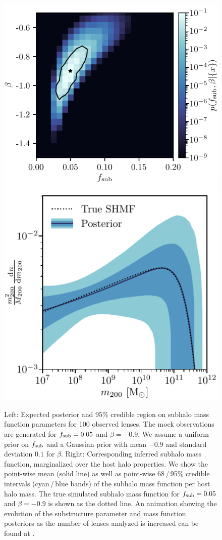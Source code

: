 \documentclass[twocolumn]{aastex63}
\begin{document}
\begin{figure}
\centering
\includegraphics[height=0.4\textwidth]{figures/posterior}%
\hspace*{0.075\textwidth}%
\includegraphics[height=0.4\textwidth]{figures/shmf}%
\hspace*{0.052\textwidth}%
\caption{Left: Expected posterior and $95\%$ credible region on subhalo mass function parameters for 100 observed lenses. The mock observations are generated for $f_{\mathrm{sub}} = 0.05$ and $\beta = -0.9$. We assume a uniform prior on $f_{\mathrm{sub}}$ and a Gaussian prior with mean $-0.9$ and standard deviation $0.1$ for $\beta$.  Right: Corresponding inferred subhalo mass function, marginalized over the host halo properties. We show the point-wise mean (solid line) as well as point-wise 68\,/\,95\% credible intervals (cyan\,/\,blue bands) of the subhalo mass function per host halo mass. The true simulated subhalo mass function for $f_{\mathrm{sub}} = 0.05$ and $\beta = -0.9$ is shown as the dotted line. An animation showing the evolution of the substructure parameter and mass function posteriors as the number of lenses analyzed is increased can be found at . }
\label{fig:bayesian_post}
\end{figure}
\end{document}
